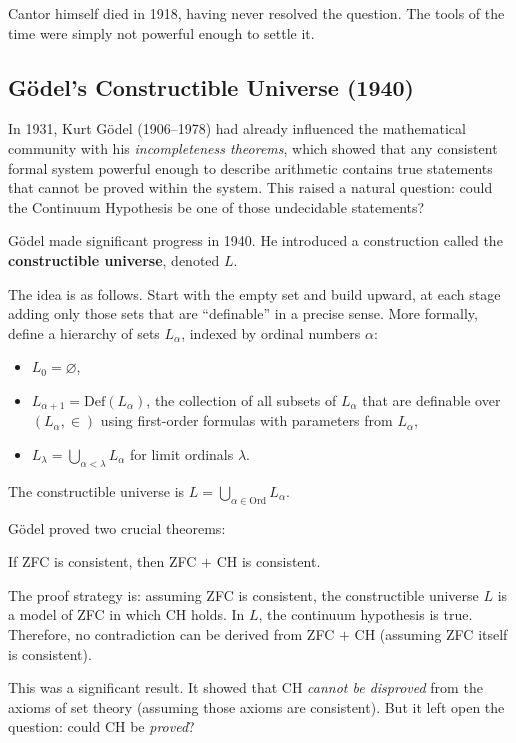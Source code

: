 Cantor himself died in 1918, having never resolved the question. The tools of the time were simply not powerful enough to settle it.

\subsection{G\"odel's Constructible Universe (1940)}

In 1931, Kurt G\"odel (1906--1978) had already influenced the mathematical community with his \emph{incompleteness theorems}, which showed that any consistent formal system powerful enough to describe arithmetic contains true statements that cannot be proved within the system. This raised a natural question: could the Continuum Hypothesis be one of those undecidable statements?

G\"odel made significant progress in 1940. He introduced a construction called the \textbf{constructible universe}, denoted $L$.

The idea is as follows. Start with the empty set and build upward, at each stage adding only those sets that are ``definable'' in a precise sense. More formally, define a hierarchy of sets $L_\alpha$, indexed by ordinal numbers $\alpha$:
\begin{itemize}
    \item $L_0 = \varnothing$,
    \item $L_{\alpha+1} = \mathrm{Def}(L_\alpha)$, the collection of all subsets of $L_\alpha$ that are definable over $(L_\alpha, \in)$ using first-order formulas with parameters from $L_\alpha$,
    \item $L_\lambda = \bigcup_{\alpha < \lambda} L_\alpha$ for limit ordinals $\lambda$.
\end{itemize}
The constructible universe is $L = \bigcup_{\alpha \in \mathrm{Ord}} L_\alpha$.

G\"odel proved two crucial theorems:

\begin{theorem}[G\"odel, 1940]
\label{thm:goedel-ch}
If ZFC is consistent, then ZFC $+$ CH is consistent.
\end{theorem}

The proof strategy is: assuming ZFC is consistent, the constructible universe $L$ is a model of ZFC in which CH holds. In $L$, the continuum hypothesis is true. Therefore, no contradiction can be derived from ZFC $+$ CH (assuming ZFC itself is consistent).

This was a significant result. It showed that CH \emph{cannot be disproved} from the axioms of set theory (assuming those axioms are consistent). But it left open the question: could CH be \emph{proved}?

